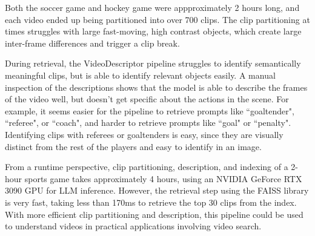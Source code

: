 Both the soccer game and hockey game were appproximately 2 hours long, and each video ended up being partitioned into over 700 clips.
The clip partitioning at times struggles with large fast-moving, high contrast objects, which create large inter-frame differences and trigger a clip break.

During retrieval, the VideoDescriptor pipeline struggles to identify semantically meaningful clips, but is able to identify relevant objects easily.
A manual inspection of the descriptions shows that the model is able to describe the frames of the video well, but doesn't get specific about the actions in the scene.
For example, it seems easier for the pipeline to retrieve prompts like ``goaltender", ``referee", or ``coach", and harder to retrieve prompts like ``goal" or ``penalty".
Identifying clips with referees or goaltenders is easy, since they are visually distinct from the rest of the players and easy to identify in an image.

From a runtime perspective, clip partitioning, description, and indexing of a 2-hour sports game takes approximately 4 hours, using an NVIDIA GeForce RTX 3090 GPU for LLM inference.
However, the retrieval step using the FAISS library is very fast, taking less than 170ms to retrieve the top 30 clips from the index.
With more efficient clip partitioning and description, this pipeline could be used to understand videos in practical applications involving video search.
